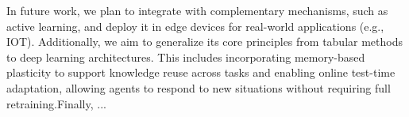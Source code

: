 In future work, we plan to integrate \adaptiverl with complementary mechanisms, such as active learning, and deploy it in edge devices for real-world applications (e.g., \ac{IOT}). Additionally, we aim to generalize its core principles from tabular methods to deep learning architectures. This includes incorporating memory-based plasticity to support knowledge reuse across tasks and enabling online test-time adaptation, allowing agents to respond to new situations without requiring full retraining.Finally, ...

\endinput

